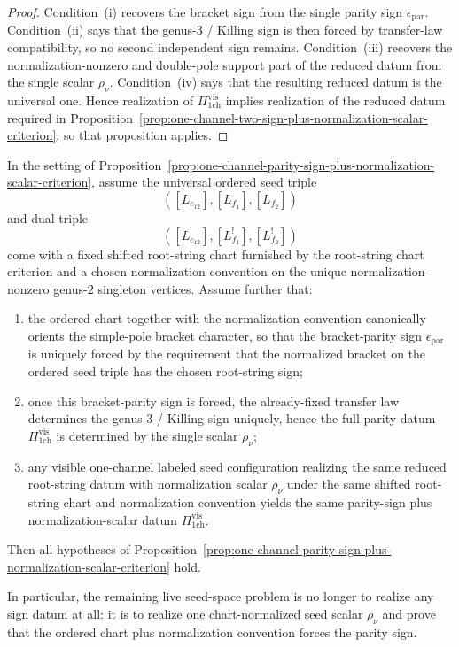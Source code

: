 \begin{proof}
Condition~\textup{(i)} recovers the bracket sign from the single parity
sign $\epsilon_{\mathrm{par}}$.
Condition~\textup{(ii)} says that the genus-$3$ / Killing sign is then
forced by transfer-law compatibility, so no second independent sign
remains.
Condition~\textup{(iii)} recovers the normalization-nonzero and
double-pole support part of the reduced datum from the single scalar
$\rho_{\nu}$.
Condition~\textup{(iv)} says that the resulting reduced datum is the
universal one.  Hence realization of
$\Pi_{\mathrm{1ch}}^{\mathrm{vis}}$
implies realization of the reduced datum required in
Proposition~\ref{prop:one-channel-two-sign-plus-normalization-scalar-criterion},
so that proposition applies.
\end{proof}

\begin{proposition}\label{prop:one-channel-parity-forcing-criterion}
In the setting of
Proposition~\textup{\ref{prop:one-channel-parity-sign-plus-normalization-scalar-criterion}},
assume the universal ordered seed triple
\[
([L_{e_{12}}],[L_{f_1}],[L_{f_2}])
\]
and dual triple
\[
([L_{e_{12}}^!],[L_{f_1}^!],[L_{f_2}^!])
\]
come with a fixed shifted root-string chart furnished by the root-string
chart criterion and a chosen normalization
convention on the unique normalization-nonzero genus-$2$ singleton
vertices.  Assume further that:
\begin{enumerate}[label=\textup{(\roman*)}]
\item the ordered chart together with the normalization convention
  canonically orients the simple-pole bracket character, so that the
  bracket-parity sign
  $\epsilon_{\mathrm{par}}$
  is uniquely forced by the requirement that the normalized bracket on
  the ordered seed triple has the chosen root-string sign;
\item once this bracket-parity sign is forced, the already-fixed
  transfer law determines the genus-$3$ / Killing sign uniquely, hence
  the full parity datum
  $\Pi_{\mathrm{1ch}}^{\mathrm{vis}}$
  is determined by the single scalar
  $\rho_{\nu}$;
\item any visible one-channel labeled seed configuration realizing the
  same reduced root-string datum with normalization scalar
  $\rho_{\nu}$
  under the same shifted root-string chart and normalization convention
  yields the
  same parity-sign plus normalization-scalar datum
  $\Pi_{\mathrm{1ch}}^{\mathrm{vis}}$.
\end{enumerate}
Then all hypotheses of
Proposition~\ref{prop:one-channel-parity-sign-plus-normalization-scalar-criterion}
hold.

In particular, the remaining live seed-space problem is no longer to
realize any sign datum at all: it is to realize one chart-normalized
seed scalar
$\rho_{\nu}$
and prove that the ordered chart plus normalization convention forces
the parity sign.
\end{proposition}

